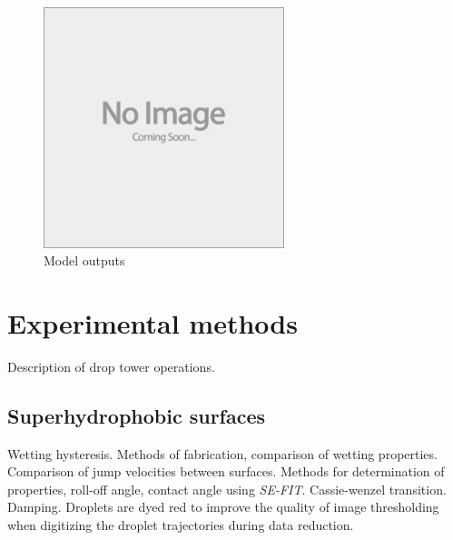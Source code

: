 \documentclass{jfm}
\begin{document}



\begin{figure}
  \centerline{\includegraphics[height=7cm,width=7cm]{e88_1_thumb.jpg}}
  \caption{Model outputs}
\label{fig:model_outputs}
\end{figure}

\section{Experimental methods}
Description of drop tower operations.
 
\subsection{Superhydrophobic surfaces}
Wetting hysteresis. Methods of fabrication, comparison of wetting properties. Comparison of jump velocities between surfaces. Methods for determination of properties, roll-off angle, contact angle using \emph{SE-FIT}. Cassie-wenzel transition. Damping. Droplets are dyed red to improve the quality of image thresholding when digitizing the droplet trajectories during data reduction.
\end{document}
